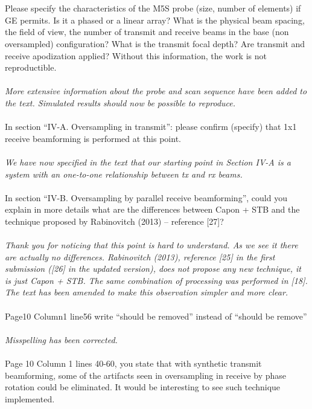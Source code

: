 \documentclass{article}
\begin{document}
\\\\
Please specify the characteristics of the M5S probe (size, number of elements) if GE permits. Is it a phased or a linear array? What is the physical beam spacing, the field of view, the number of transmit and receive beams in the base (non oversampled) configuration? What is the transmit focal depth? Are transmit and receive apodization applied? Without this information, the work is not reproductible.
\\\\
\textit{More extensive information about the probe and scan sequence have been added to the text. Simulated results should now be possible to reproduce.}
\\\\
In section “IV-A. Oversampling in transmit”: please confirm (specify) that 1x1 receive beamforming is performed at this point.
\\\\
\textit{We have now specified in the text that our starting point in Section IV-A is a system with an one-to-one relationship between tx and rx beams.}
\\\\
In section “IV-B. Oversampling by parallel receive beamforming”, could you explain in more details what are the differences between Capon + STB and the technique proposed by Rabinovitch (2013) – reference [27]?
\\\\
\textit{Thank you for noticing that this point is hard to understand. As we see it there are actually no differences. Rabinovitch (2013), reference [25] in the first submission ([26] in the updated version), does not propose any new technique, it is just Capon + STB. The same combination of processing was performed in [18]. The text has been amended to make this observation simpler and more clear.}
\\\\
Page10 Column1 line56  write “should be removed” instead of “should be remove”
\\\\
\textit{Misspelling has been corrected.}
\\\\
Page 10 Column 1 lines 40-60, you state that with synthetic transmit beamforming, some of the artifacts seen in oversampling in receive by phase rotation could be eliminated. It would be interesting to see such technique implemented.
\\\\
\end{document}
